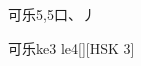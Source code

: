 \begin{entry}{可乐}{5,5}{⼝、⼃}
  \begin{phonetics}{可乐}{ke3 le4}[][HSK 3]
  \end{phonetics}
\end{entry}
